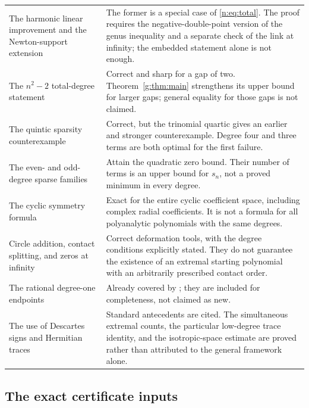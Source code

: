 \documentclass[UTF8,11pt]{ctexart}
\theoremstyle{definition}
\numberwithin{equation}{section}
\begin{document}
\begin{longtable}{@{}>{\raggedright\arraybackslash}p{}>{\raggedright\arraybackslash}p{}@{}}
The harmonic linear improvement and the Newton-support extension & The former is a special case of \eqref{n:eq:total}. The proof requires the negative-double-point version of the genus inequality and a separate check of the link at infinity; the embedded statement alone is not enough. \\
The $n^2-2$ total-degree statement & Correct and sharp for a gap of two. Theorem~\ref{g:thm:main} strengthens its upper bound for larger gaps; general equality for those gaps is not claimed. \\
The quintic sparsity counterexample & Correct, but the trinomial quartic gives an earlier and stronger counterexample. Degree four and three terms are both optimal for the first failure. \\
The even- and odd-degree sparse families & Attain the quadratic zero bound. Their number of terms is an upper bound for $s_n$, not a proved minimum in every degree. \\
The cyclic symmetry formula & Exact for the entire cyclic coefficient space, including complex radial coefficients. It is not a formula for all polyanalytic polynomials with the same degrees. \\
Circle addition, contact splitting, and zeros at infinity & Correct deformation tools, with the degree conditions explicitly stated. They do not guarantee the existence of an extremal starting polynomial with an arbitrarily prescribed contact order. \\
The rational degree-one endpoints & Already covered by \cite{KN06,LSL15,LZ18,LM14}; they are included for completeness, not claimed as new. \\
The use of Descartes signs and Hermitian traces & Standard antecedents are cited. The simultaneous extremal counts, the particular low-degree trace identity, and the isotropic-space estimate are proved rather than attributed to the general framework alone. \\
\bottomrule
\end{longtable}
\normalsize

\subsection{The exact certificate inputs}
\end{document}
